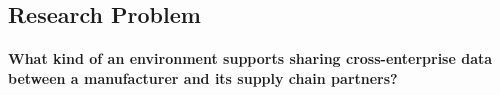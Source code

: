 

















\subsection{Research Problem}

\paragraph*{What kind of an environment supports sharing cross-enterprise data between a manufacturer and its supply chain partners?}



